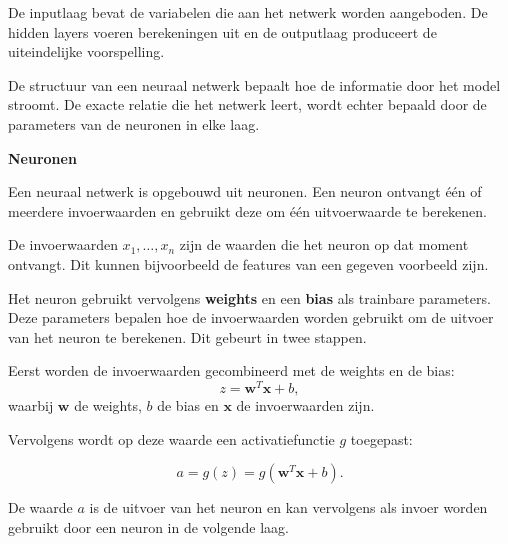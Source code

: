 \documentclass{ximera}
\begin{document}
De inputlaag bevat de variabelen die aan het netwerk worden aangeboden. De hidden layers voeren berekeningen uit en de outputlaag produceert de uiteindelijke voorspelling.

De structuur van een neuraal netwerk bepaalt hoe de informatie door het model stroomt. De exacte relatie die het netwerk leert, wordt echter bepaald door de parameters van de neuronen in elke laag. 

\begin{definition}\textbf{Neuronen}

Een neuraal netwerk is opgebouwd uit neuronen. Een neuron ontvangt één of meerdere invoerwaarden en gebruikt deze om één uitvoerwaarde te berekenen.

De invoerwaarden $x_1,\ldots,x_n$ zijn de waarden die het neuron op dat moment ontvangt. Dit kunnen bijvoorbeeld de features van een gegeven voorbeeld zijn. 

Het neuron gebruikt vervolgens \textbf{weights} en een \textbf{bias} als trainbare parameters. Deze parameters bepalen hoe de invoerwaarden worden gebruikt om de uitvoer van het neuron te berekenen. Dit gebeurt in twee stappen.

Eerst worden de invoerwaarden gecombineerd met de weights en de bias:
\[
z=\mathbf{w}^T\mathbf{x}+b,
\]
waarbij $\mathbf{w}$ de weights, $b$ de bias en $\mathbf{x}$ de invoerwaarden zijn.

Vervolgens wordt op deze waarde een activatiefunctie $g$ toegepast:

\[
a=g(z)=g\left(\mathbf{w}^T\mathbf{x}+b\right).
\]

De waarde $a$ is de uitvoer van het neuron en kan vervolgens als invoer worden gebruikt door een neuron in de volgende laag.

\begin{figure}[ht]
\centering
{}
\end{figure}
\end{definition}
\end{document}
